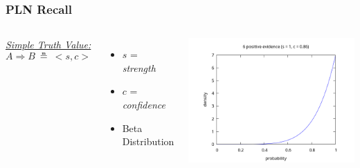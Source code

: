 \documentclass[aspectratio=169]{beamer}
\newcommand{\limp}{\Rightarrow}
\newcommand{\STV}[2]{<\!#1, #2\!>}
\begin{document}
\begin{frame}
  \frametitle{PLN Recall}
  \begin{columns}
    \column{5cm}
    \underline{\emph{Simple Truth Value:}}
    $$A \limp B\ \measeq\ \STV{s}{c}$$
    \begin{itemize}
    \item $s$ = \emph{strength}
    \item $c$ = \emph{confidence}
    \item Beta Distribution
    \end{itemize}
    \column{10cm}
    \includegraphics[scale=0.4]{figs/observations_0_6.png}
  \end{columns}
\end{frame}
\end{document}
